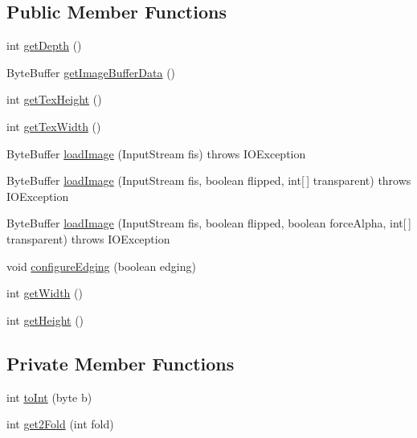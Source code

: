 \subsection*{Public Member Functions}
\begin{DoxyCompactItemize}
\item 
int \mbox{\hyperlink{classorg_1_1newdawn_1_1slick_1_1opengl_1_1_p_n_g_image_data_ae49f5e4da41bec192c7155e01805343c}{get\+Depth}} ()
\item 
Byte\+Buffer \mbox{\hyperlink{classorg_1_1newdawn_1_1slick_1_1opengl_1_1_p_n_g_image_data_abde9855e2ad874c293a3be32494aeee5}{get\+Image\+Buffer\+Data}} ()
\item 
int \mbox{\hyperlink{classorg_1_1newdawn_1_1slick_1_1opengl_1_1_p_n_g_image_data_aae4743c9696538fdb2717bf7d5a70d0b}{get\+Tex\+Height}} ()
\item 
int \mbox{\hyperlink{classorg_1_1newdawn_1_1slick_1_1opengl_1_1_p_n_g_image_data_a11b46d2443b057d49f3e893fa9eca716}{get\+Tex\+Width}} ()
\item 
Byte\+Buffer \mbox{\hyperlink{classorg_1_1newdawn_1_1slick_1_1opengl_1_1_p_n_g_image_data_ad5507c5228d071b2936b8aa91f18e9e1}{load\+Image}} (Input\+Stream fis)  throws I\+O\+Exception 
\item 
Byte\+Buffer \mbox{\hyperlink{classorg_1_1newdawn_1_1slick_1_1opengl_1_1_p_n_g_image_data_a9a005163153012911fd6a209ae5f2613}{load\+Image}} (Input\+Stream fis, boolean flipped, int\mbox{[}$\,$\mbox{]} transparent)  throws I\+O\+Exception 
\item 
Byte\+Buffer \mbox{\hyperlink{classorg_1_1newdawn_1_1slick_1_1opengl_1_1_p_n_g_image_data_ac6fdfb909f0b3ee35afebc4ea1940637}{load\+Image}} (Input\+Stream fis, boolean flipped, boolean force\+Alpha, int\mbox{[}$\,$\mbox{]} transparent)  throws I\+O\+Exception 
\item 
void \mbox{\hyperlink{classorg_1_1newdawn_1_1slick_1_1opengl_1_1_p_n_g_image_data_a9083d1ca4c73f7d648eaa73d477d4d63}{configure\+Edging}} (boolean edging)
\item 
int \mbox{\hyperlink{classorg_1_1newdawn_1_1slick_1_1opengl_1_1_p_n_g_image_data_a6f5520a374bf2ab19d08116c27017833}{get\+Width}} ()
\item 
int \mbox{\hyperlink{classorg_1_1newdawn_1_1slick_1_1opengl_1_1_p_n_g_image_data_a9d1cd9b5b83fed3b02f07413e026ecc9}{get\+Height}} ()
\end{DoxyCompactItemize}
\subsection*{Private Member Functions}
\begin{DoxyCompactItemize}
\item 
int \mbox{\hyperlink{classorg_1_1newdawn_1_1slick_1_1opengl_1_1_p_n_g_image_data_acdc6d26ea35098d598dd128ac5629724}{to\+Int}} (byte b)
\item 
int \mbox{\hyperlink{classorg_1_1newdawn_1_1slick_1_1opengl_1_1_p_n_g_image_data_a9066e5e41011de1eef2d1d40e4d245d7}{get2\+Fold}} (int fold)
\end{DoxyCompactItemize}
